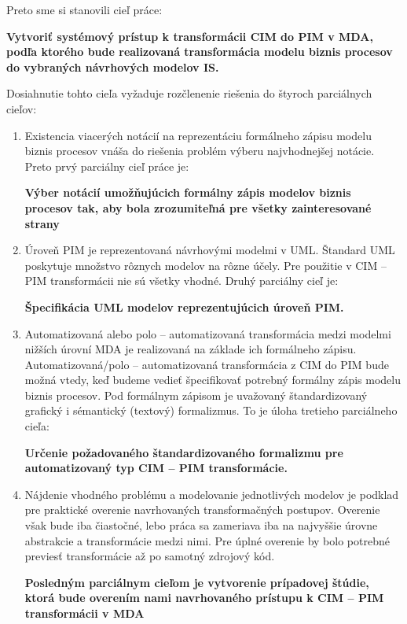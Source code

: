 Preto sme si stanovili cieľ práce: 

\textbf{Vytvoriť systémový prístup k transformácii CIM do PIM v MDA, podľa ktorého bude realizovaná transformácia modelu biznis procesov do vybraných návrhových modelov IS.}

Dosiahnutie tohto cieľa vyžaduje rozčlenenie riešenia do štyroch parciálnych cieľov: 

\begin{enumerate}
	\item Existencia viacerých notácií na reprezentáciu formálneho zápisu modelu biznis procesov vnáša do riešenia problém výberu najvhodnejšej notácie. Preto prvý parciálny cieľ práce je:
	
	\textbf{Výber notácií umožňujúcich formálny zápis modelov biznis procesov tak, aby bola zrozumiteľná pre všetky zainteresované strany}
	
	\item Úroveň PIM je reprezentovaná návrhovými modelmi v UML. Štandard UML poskytuje množstvo rôznych modelov na rôzne účely. Pre použitie v CIM – PIM transformácii nie sú všetky vhodné. Druhý parciálny cieľ je:
	
	\textbf{Špecifikácia UML modelov reprezentujúcich úroveň PIM.}
	
	\item Automatizovaná alebo polo – automatizovaná transformácia medzi modelmi nižších úrovní MDA je realizovaná na základe ich formálneho zápisu. Automatizovaná/polo – automatizovaná transformácia z CIM do PIM bude možná vtedy, keď budeme vedieť špecifikovať potrebný formálny zápis modelu biznis procesov. Pod formálnym zápisom je uvažovaný štandardizovaný grafický i sémantický (textový) formalizmus. To je úloha tretieho parciálneho cieľa:
	
	\textbf{Určenie požadovaného štandardizovaného formalizmu pre automatizovaný typ CIM – PIM transformácie.}
	
	\item Nájdenie vhodného problému a modelovanie jednotlivých modelov je podklad pre praktické overenie navrhovaných transformačných postupov. Overenie však bude iba čiastočné, lebo práca sa zameriava iba na najvyššie úrovne abstrakcie a transformácie medzi nimi. Pre úplné overenie by bolo potrebné previesť transformácie až po samotný zdrojový kód.
	
	\textbf{Posledným parciálnym cieľom je vytvorenie prípadovej štúdie, ktorá bude overením nami navrhovaného prístupu k CIM – PIM transformácii v MDA}
\end{enumerate}

